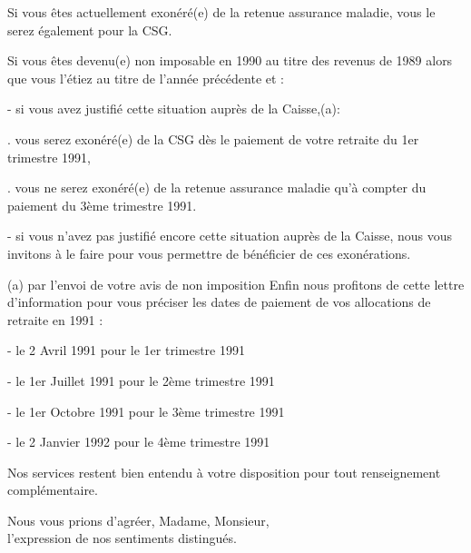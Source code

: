 Si vous êtes actuellement exonéré(e) de la retenue assurance maladie, vous le serez également pour la CSG.

Si vous êtes devenu(e) non imposable en 1990 au titre des revenus de 1989 alors que vous l'étiez au titre de l'année précédente et :

- si vous avez justifié cette situation auprès de la Caisse,(a):

. vous serez exonéré(e) de la CSG dès le paiement de votre retraite du 1er trimestre 1991,

. vous ne serez exonéré(e) de la retenue assurance maladie qu'à compter du paiement du 3ème trimestre 1991.

- si vous n'avez pas justifié encore cette situation auprès de la Caisse, nous vous invitons à le faire pour vous permettre de bénéficier de ces exonérations.


(a) par l'envoi de votre avis de non imposition
Enfin nous profitons de cette lettre d'information pour vous préciser les dates de paiement de vos allocations de retraite en 1991 :

- le 2 Avril 1991 pour le 1er trimestre 1991

- le 1er Juillet 1991 pour le 2ème trimestre 1991

- le 1er Octobre 1991 pour le 3ème trimestre 1991

- le 2 Janvier 1992 pour le 4ème trimestre 1991

Nos services restent bien entendu à votre disposition pour tout renseignement complémentaire.

Nous vous prions d'agréer, Madame, Monsieur,\\
l'expression de nos sentiments distingués.\\

